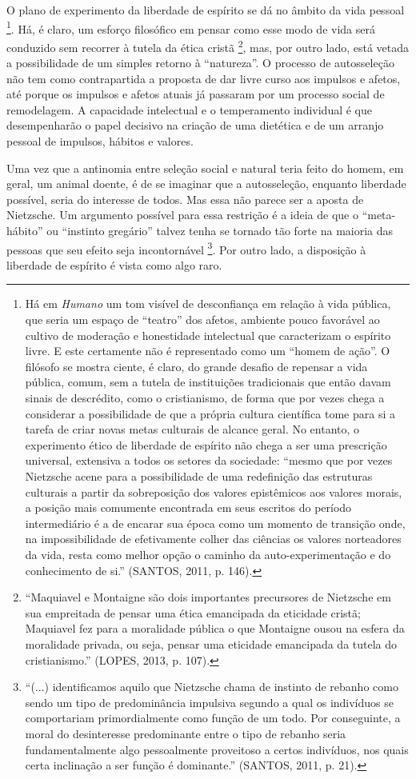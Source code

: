 \documentclass[
	12pt,				%
	openright,			%
	oneside,			%
	a4paper,			%
	english,			%
	french,				%
	spanish,			%
	brazil				%
	]{abntex2}
\begin{document}
O plano de experimento da liberdade de espírito se dá no âmbito da vida pessoal
\footnote{Há em \textit{Humano} um tom visível de desconfiança em relação à vida pública, que seria um espaço de “teatro” dos afetos, ambiente pouco favorável ao cultivo de moderação e honestidade intelectual que caracterizam o espírito livre. E este certamente não é representado como um “homem de ação”. O filósofo se mostra ciente, é claro, do grande desafio de repensar a vida pública, comum, sem a tutela de instituições tradicionais que então davam sinais de descrédito, como o cristianismo, de forma que por vezes chega a considerar a possibilidade de que a própria cultura científica tome para si a tarefa de criar novas metas culturais de alcance geral. No entanto, o experimento ético de liberdade de espírito não chega a ser uma prescrição universal, extensiva a todos os setores da sociedade: “mesmo que por vezes Nietzsche acene para a possibilidade de uma redefinição das estruturas culturais a partir da sobreposição dos valores epistêmicos aos valores morais, a posição mais comumente encontrada em seus escritos do período intermediário é a de encarar sua época como um momento de transição onde, na impossibilidade de efetivamente colher das ciências os valores norteadores da vida, resta como melhor opção o caminho da auto-experimentação e do conhecimento de si.” (SANTOS, 2011, p. 146). }. 
Há, é claro, um esforço filosófico em pensar como esse modo de vida será conduzido sem recorrer à tutela da ética cristã
\footnote{“Maquiavel e Montaigne são dois importantes precursores de Nietzsche em sua empreitada de pensar uma ética emancipada da eticidade cristã; Maquiavel fez para a moralidade pública o que Montaigne ousou na esfera da moralidade privada, ou seja, pensar uma eticidade emancipada da tutela do cristianismo.” (LOPES, 2013, p. 107).}, 
mas, por outro lado, está vetada a possibilidade de um simples retorno à “natureza”. O processo de autosseleção não tem como contrapartida a proposta de dar livre curso aos impulsos e afetos, até porque os impulsos e afetos atuais já passaram por um processo social de remodelagem. A capacidade intelectual e o temperamento individual é que desempenharão o papel decisivo na criação de uma dietética e de um arranjo pessoal de impulsos, hábitos e valores.

	Uma vez que a antinomia entre seleção social e natural teria feito do homem, em geral, um animal doente, é de se imaginar que a autosseleção, enquanto liberdade possível, seria do interesse de todos. Mas essa não parece ser a aposta de Nietzsche. Um argumento possível para essa restrição é a ideia de que o “meta-hábito” ou “instinto gregário” talvez tenha se tornado tão forte na maioria das pessoas que seu efeito seja incontornável
\footnote{“(...) identificamos aquilo que Nietzsche chama de instinto de rebanho como sendo um tipo de predominância impulsiva segundo a qual os indivíduos se comportariam primordialmente como função de um todo. Por conseguinte, a moral do desinteresse predominante entre o tipo de rebanho seria fundamentalmente algo pessoalmente proveitoso a certos indivíduos, nos quais certa inclinação a ser função é dominante.” (SANTOS, 2011, p. 21).}.
Por outro lado, a disposição à liberdade de espírito é vista como algo raro. 
\end{document}
